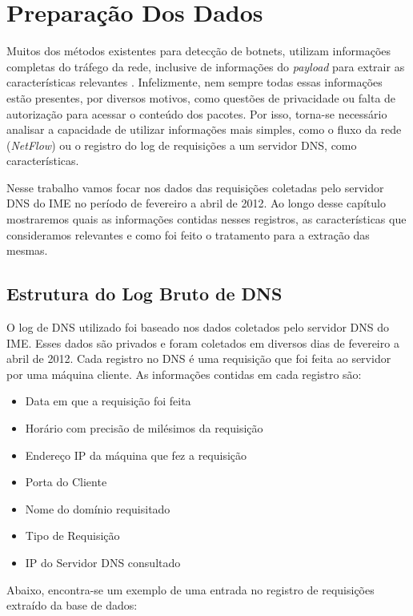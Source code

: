 \chapter{Preparação Dos Dados} \label{ch:data_preparation}
Muitos dos métodos existentes para detecção de botnets, utilizam informações completas do tráfego da rede, inclusive de informações do \textit{payload} para extrair as características relevantes \citep{krmicek2011inspecting}. Infelizmente, nem sempre todas essas informações estão presentes, por diversos motivos, como questões de privacidade ou falta de autorização para acessar o conteúdo dos pacotes. Por isso, torna-se necessário analisar a capacidade de utilizar informações mais simples, como o fluxo da rede (\textit{NetFlow}) ou o registro do log de requisições a um servidor DNS, como características.

Nesse trabalho vamos focar nos dados das requisições coletadas pelo servidor DNS do IME no período de fevereiro a abril de 2012. Ao longo desse capítulo mostraremos quais as informações contidas nesses registros, as características que consideramos relevantes e como foi feito o tratamento para a extração das mesmas.

\section{Estrutura do Log Bruto de DNS }
O log de DNS utilizado foi baseado nos dados coletados pelo servidor DNS do IME. Esses dados são privados e foram coletados em diversos dias de fevereiro a abril de 2012. Cada registro no DNS é uma requisição que foi feita ao servidor por uma máquina cliente. As informações contidas em cada registro são:

\begin{itemize}
\item Data em que a requisição foi feita
\item Horário com precisão de milésimos da requisição
\item Endereço IP da máquina que fez a requisição
\item Porta do Cliente
\item Nome do domínio requisitado
\item Tipo de Requisição
\item IP do Servidor DNS consultado
\end{itemize}

Abaixo, encontra-se um exemplo de uma entrada no registro de requisições extraído da base de dados: 

